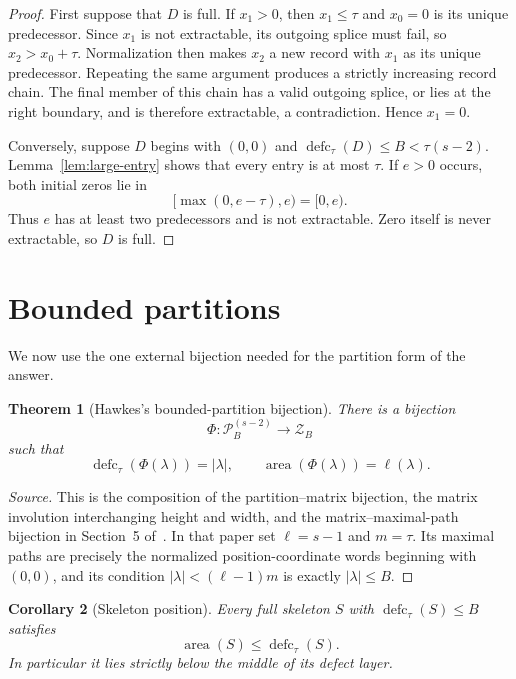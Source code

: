 \documentclass[11pt]{article}
\newtheorem{theorem}{Theorem}[section]
\newtheorem{corollary}[theorem]{Corollary}
\theoremstyle{definition}
\theoremstyle{remark}
\newcommand{\area}{\operatorname{area}}
\newcommand{\defc}{\operatorname{defc}}
\begin{document}
\begin{proof}
First suppose that $D$ is full.  If $x_1>0$, then $x_1\le\tau$ and $x_0=0$
is its unique predecessor.  Since $x_1$ is not extractable, its outgoing
splice must fail, so $x_2>x_0+\tau$.  Normalization then makes $x_2$ a new
record with $x_1$ as its unique predecessor.  Repeating the same argument
produces a strictly increasing record chain.  The final member of this chain
has a valid outgoing splice, or lies at the right boundary, and is therefore
extractable, a contradiction.  Hence $x_1=0$.

Conversely, suppose $D$ begins with $(0,0)$ and
$\defc_\tau(D)\le B<\tau(s-2)$.  Lemma~\ref{lem:large-entry} shows that every
entry is at most $\tau$.  If $e>0$ occurs, both initial zeros lie in
\[
  [\max(0,e-\tau),e)=[0,e).
\]
Thus $e$ has at least two predecessors and is not extractable.  Zero itself
is never extractable, so $D$ is full.
\end{proof}

\section{Bounded partitions}

We now use the one external bijection needed for the partition form of the
answer.

\begin{theorem}[Hawkes's bounded-partition bijection]
\label{thm:partition-bijection}
There is a bijection
\[
  \Phi:\mathcal P_B^{(s-2)}\longrightarrow\mathcal Z_B
\]
such that
\begin{equation}
  \defc_\tau(\Phi(\lambda))=|\lambda|,
  \qquad
  \area(\Phi(\lambda))=\ell(\lambda).
  \label{eq:partition-statistics}
\end{equation}
\end{theorem}

\begin{proof}[Source]
This is the composition of the partition--matrix bijection, the matrix
involution interchanging height and width, and the matrix--maximal-path
bijection in Section~5 of~\cite{Hawkes2024}.  In that paper set
$\ell=s-1$ and $m=\tau$.  Its maximal paths are precisely the normalized
position-coordinate words beginning with $(0,0)$, and its condition
$|\lambda|<(\ell-1)m$ is exactly $|\lambda|\le B$.
\end{proof}

\begin{corollary}[Skeleton position]
\label{cor:skeleton-position}
Every full skeleton $S$ with $\defc_\tau(S)\le B$ satisfies
\[
  \area(S)\le\defc_\tau(S).
\]
In particular it lies strictly below the middle of its defect layer.
\end{corollary}
\end{document}
